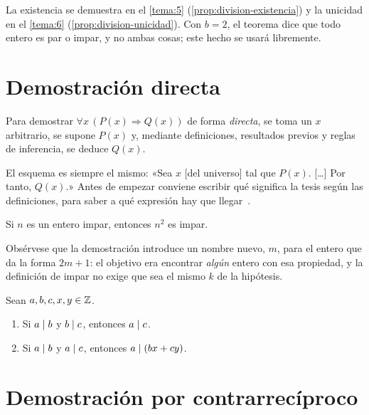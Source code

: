 La existencia se demuestra en el \cref{tema:5} (\cref{prop:division-existencia}) y la unicidad en el \cref{tema:6} (\cref{prop:division-unicidad}). Con $b=2$, el teorema dice que todo entero es par o impar, y no ambas cosas; este hecho se usará libremente.

\section{Demostración directa}

\begin{definicion}\label{def:directa}
Para demostrar $\forall x\,(P(x)\Rightarrow Q(x))$ de forma \emph{directa}, se toma un $x$ arbitrario, se supone $P(x)$ y, mediante definiciones, resultados previos y reglas de inferencia, se deduce $Q(x)$.
\end{definicion}

El esquema es siempre el mismo: «Sea $x$ [del universo] tal que $P(x)$. [\dots] Por tanto, $Q(x)$.» Antes de empezar conviene escribir qué significa la tesis según las definiciones, para saber a qué expresión hay que llegar~\cite[§4.3]{hammack}.

\begin{proposicion}\label{prop:impar-cuadrado}
Si $n$ es un entero impar, entonces $n^{2}$ es impar.
\end{proposicion}

Obsérvese que la demostración introduce un nombre nuevo, $m$, para el entero que da la forma $2m+1$: el objetivo era encontrar \emph{algún} entero con esa propiedad, y la definición de impar no exige que sea el mismo $k$ de la hipótesis.

\begin{proposicion}\label{prop:divisibilidad}
Sean $a,b,c,x,y\in\mathbb{Z}$.
\begin{enumerate}
  \item Si $a\mid b$ y $b\mid c$, entonces $a\mid c$.
  \item Si $a\mid b$ y $a\mid c$, entonces $a\mid(bx+cy)$.
\end{enumerate}
\end{proposicion}

\addtocounter{definicion}{1}%

\section{Demostración por contrarrecíproco}

